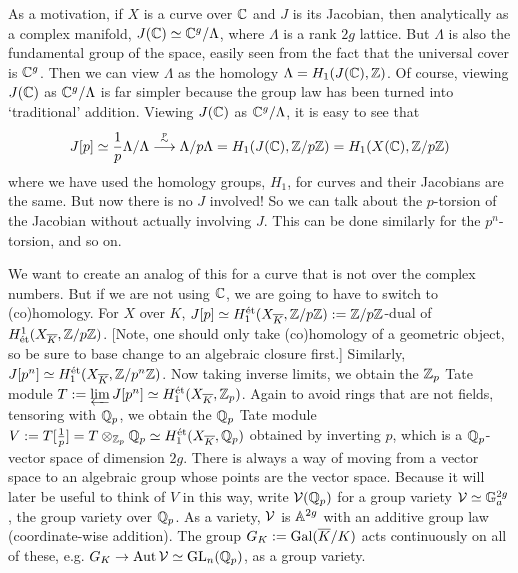 As a motivation, if $X$ is a curve over $\mathbb{C}$ and $J$ is its Jacobian, then analytically as a complex manifold, $J(\mathbb{C}) \simeq \mathbb{C}^g/ \Lambda$, where $\Lambda$ is a rank $2g$ lattice. But $\Lambda$ is also the fundamental group of the space, easily seen from the fact that the universal cover is $\mathbb{C}^g$. Then we can view $\Lambda$ as the homology $\Lambda= H_1(J(\mathbb{C}),\mathbb{Z})$. Of course, viewing $J(\mathbb{C})$ as $\mathbb{C}^g/\Lambda$ is far simpler because the group law has been turned into `traditional' addition. Viewing $J(\mathbb{C})$ as $\mathbb{C}^g/\Lambda$, it is easy to see that 
	\[
	J[p] \simeq \frac{1}{p} \Lambda/\Lambda \stackrel{\stackrel{p}{\sim}}{\longrightarrow} \Lambda/p\Lambda= H_1(J(\mathbb{C}), \mathbb{Z}/p\mathbb{Z})= H_1(X(\mathbb{C}),\mathbb{Z}/p\mathbb{Z}) 
	\]
where we have used the homology groups, $H_1$, for curves and their Jacobians are the same. But now there is no $J$ involved! So we can talk about the $p$-torsion of the Jacobian without actually involving $J$. This can be done similarly for the $p^n$-torsion, and so on. 


We want to create an analog of this for a curve that is not over the complex numbers. But if we are not using $\mathbb{C}$, we are going to have to switch to \Etale (co)homology. For $X$ over $K$, $J[p] \simeq H_1^{\text{\'et}}(X_{\overline{K}}, \mathbb{Z}/p\mathbb{Z}):= \mathbb{Z}/p\mathbb{Z}$-dual of $H^1_{\text{\'et}}(X_{\overline{K}}, \mathbb{Z}/p\mathbb{Z})$. [Note, one should only take \etale (co)homology of a geometric object, so be sure to base change to an algebraic closure first.] Similarly, $J[p^n] \simeq H_1^{\text{\'et}}(X_{\overline{K}}, \mathbb{Z}/p^n\mathbb{Z})$. Now taking inverse limits, we obtain the $\mathbb{Z}_p$ Tate module $T:= \varprojlim J[p^n] \simeq H_1^{\text{\'et}}(X_{\overline{K}}, \mathbb{Z}_p)$. Again to avoid rings that are not fields, tensoring with $\mathbb{Q}_p$, we obtain the $\mathbb{Q}_p$ Tate module $V:= T[\frac{1}{p}]= T \otimes_{\mathbb{Z}_p} \mathbb{Q}_p \simeq H_1^{\text{\'et}}(X_{\overline{K}}, \mathbb{Q}_p)$ obtained by inverting $p$, which is a $\mathbb{Q}_p$-vector space of dimension $2g$. There is always a way of moving from a vector space to an algebraic group whose points are the vector space. Because it will later be useful to think of $V$ in this way, write $\mathcal{V}(\mathbb{Q}_p)$ for a group variety $\mathcal{V} \simeq \mathbb{G}_a^{2g}$, the group variety over $\mathbb{Q}_p$. As a variety, $\mathcal{V}$ is $\mathbb{A}^{2g}$ with an additive group law (coordinate-wise addition). The group $G_K:= \operatorname{Gal}(\overline{K}/K)$ acts continuously on all of these, e.g. $G_K \to \operatorname{Aut} \mathcal{V} \simeq \operatorname{GL}_n(\mathbb{Q}_p)$, as a group variety. 

